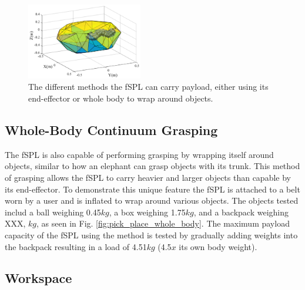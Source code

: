 \documentclass[letterpaper, 10 pt, conference]{ieeeconf}  %
\begin{document}
\begin{figure}[t!]
\centering
\includegraphics[width=0.45\textwidth]{Figures/Workspace_Fabric_ARM}
\caption{The different methods the fSPL can carry payload, either using its end-effector or whole body to wrap around objects.}
\label{fig:workspace_fabric_arm}
\vspace{-1.5em}
\end{figure}

\subsection{Whole-Body Continuum Grasping}

The fSPL is also capable of performing grasping by wrapping itself around objects, similar to how an elephant can grasp objects with its trunk. This method of grasping allows the fSPL to carry heavier and larger objects than capable by its end-effector. To demonstrate this unique feature the fSPL is attached to a belt worn by a user and is inflated to wrap around various objects. The objects tested includ a ball weighing 0.45$kg$, a box weighing 1.75$kg$, and a backpack weighing XXX, $kg$, as seen in Fig. \ref{fig:pick_place_whole_body}. The maximum payload capacity of the fSPL using the method is tested by gradually adding weights into the backpack resulting in a load of 4.51$kg$ (4.5$x$ its own body weight).


\subsection{Workspace}
\end{document}
